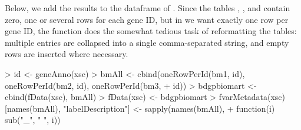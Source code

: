 %
Below, we add the results
to the dataframe  of . 
Since the tables ,
, and  contain zero, one or several rows for
each gene ID, but in  we want exactly one row per
gene ID, the function  does the somewhat tedious
task of reformatting the tables: multiple entries are collapsed
into a single comma-separated string, and empty rows are inserted
where necessary.
%
\begin{Schunk}
\begin{Sinput}
> id <- geneAnno(xsc)
> bmAll <- cbind(oneRowPerId(bm1, id), oneRowPerId(bm2, id), oneRowPerId(bm3, 
+     id))
> bdgpbiomart <- cbind(fData(xsc), bmAll)
> fData(xsc) <- bdgpbiomart
> fvarMetadata(xsc)[names(bmAll), "labelDescription"] <- sapply(names(bmAll), 
+     function(i) sub("_", " ", i))
\end{Sinput}
\end{Schunk}



